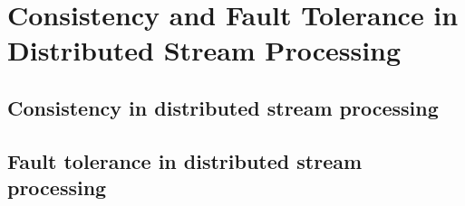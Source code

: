 \chapter{Consistency and Fault Tolerance in Distributed Stream Processing}
\label{thesis-chapter-literature-review}

\section{Consistency in distributed stream processing}
\label{consistency_overview}


\section{Fault tolerance in distributed stream processing}
\label{phd-related-fault-tolerance}
